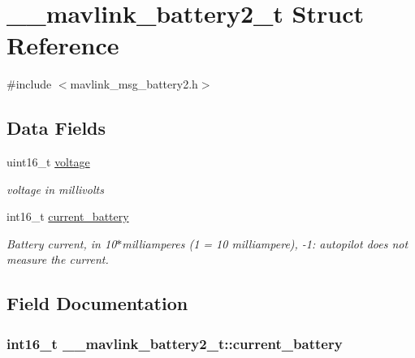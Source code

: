 \hypertarget{struct____mavlink__battery2__t}{\section{\+\_\+\+\_\+mavlink\+\_\+battery2\+\_\+t Struct Reference}
\label{struct____mavlink__battery2__t}
}


{\ttfamily \#include $<$mavlink\+\_\+msg\+\_\+battery2.\+h$>$}

\subsection*{Data Fields}
\begin{DoxyCompactItemize}
\item 
uint16\+\_\+t \hyperlink{struct____mavlink__battery2__t_a17ce235f43d135a9ff3eb21df2657519}{voltage}
\begin{DoxyCompactList}\small\item\em voltage in millivolts \end{DoxyCompactList}\item 
int16\+\_\+t \hyperlink{struct____mavlink__battery2__t_a9d30fe2525184e1ced78375b70502b7c}{current\+\_\+battery}
\begin{DoxyCompactList}\small\item\em Battery current, in 10$\ast$milliamperes (1 = 10 milliampere), -\/1\+: autopilot does not measure the current. \end{DoxyCompactList}\end{DoxyCompactItemize}


\subsection{Field Documentation}
\hypertarget{struct____mavlink__battery2__t_a9d30fe2525184e1ced78375b70502b7c}{
\subsubsection[{current\+\_\+battery}]{\setlength{\rightskip}{0pt plus 5cm}int16\+\_\+t \+\_\+\+\_\+mavlink\+\_\+battery2\+\_\+t\+::current\+\_\+battery}}\label{struct____mavlink__battery2__t_a9d30fe2525184e1ced78375b70502b7c}


